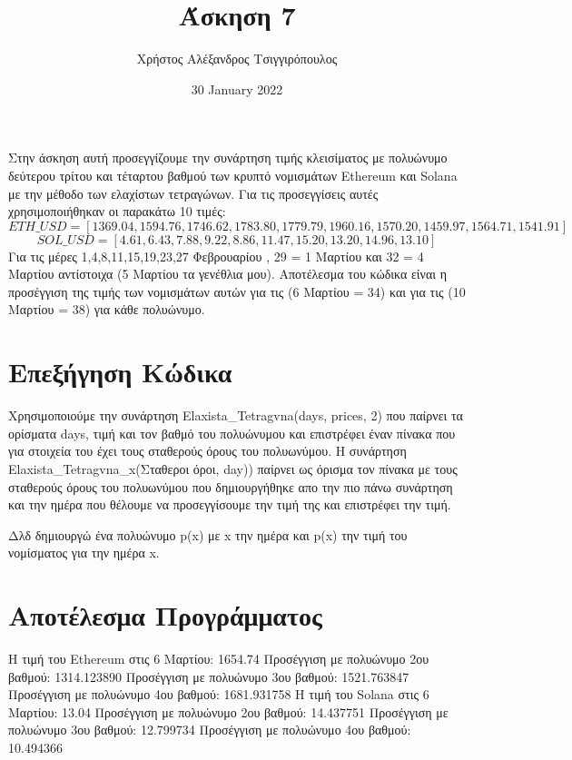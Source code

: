 \documentclass{article}
\title{Άσκηση 7}
\author{Χρήστος Αλέξανδρος Τσιγγιρόπουλος}
\date{30 January 2022}
\begin{document}
    \maketitle
    Στην άσκηση αυτή προσεγγίζουμε την συνάρτηση τιμής κλεισίματος με πολυώνυμο δεύτερου 
    τρίτου και τέταρτου βαθμού των κρυπτό νομισμάτων Ethereum και Solana με την μέθοδο των 
    ελαχίστων τετραγώνων. Για τις προσεγγίσεις αυτές χρησιμοποιήθηκαν οι παρακάτω 10 τιμές:
    \begin{equation*}
        ETH\_USD = [1369.04, 1594.76, 1746.62, 1783.80, 1779.79, 1960.16, 1570.20, 1459.97, 1564.71, 1541.91]
    \end{equation*}
    \begin{equation*}
        SOL\_USD = [4.61, 6.43, 7.88, 9.22, 8.86, 11.47, 15.20, 13.20, 14.96, 13.10]
    \end{equation*}
    Για τις μέρες 1,4,8,11,15,19,23,27 Φεβρουαρίου , 29 = 1 Μαρτίου και 32 = 4 Μαρτίου 
    αντίστοιχα (5 Μαρτίου τα γενέθλια μου).
    Αποτέλεσμα του κώδικα είναι η προσέγγιση της τιμής των νομισμάτων αυτών για τις 
     (6 Μαρτίου = 34) και για τις (10 Μαρτίου = 38) για κάθε πολυώνυμο.

    \section{Επεξήγηση Κώδικα}
    Χρησιμοποιούμε την συνάρτηση Elaxista\_Tetragvna(days, prices, 2) που παίρνει τα ορίσματα days, τιμή και τον βαθμό του πολυώνυμου και επιστρέφει έναν πίνακα που 
    για στοιχεία του έχει τους σταθερούς όρους του πολυωνύμου. Η συνάρτηση Elaxista\_Tetragvna\_x(Σταθεροι όροι, day)) παίρνει ως όρισμα τον πίνακα με τους
    σταθερούς όρους του πολυωνύμου που δημιουργήθηκε απο την πιο πάνω συνάρτηση
    και την ημέρα που θέλουμε να προσεγγίσουμε την τιμή της και επιστρέφει την τιμή.
    
    Δλδ δημιουργώ ένα πολυώνυμο p(x) με x την ημέρα και p(x) την τιμή του νομίσματος για την
    ημέρα x.
    
    \section{Αποτέλεσμα Προγράμματος}
 Η τιμή του Ethereum στις 6 Μαρτίου: 1654.74
     Προσέγγιση με πολυώνυμο 2ου βαθμού: 1314.123890
     Προσέγγιση με πολυώνυμο 3ου βαθμού: 1521.763847
     Προσέγγιση με πολυώνυμο 4ου βαθμού: 1681.931758
 Η τιμή του Solana στις 6 Μαρτίου: 13.04
     Προσέγγιση με πολυώνυμο 2ου βαθμού: 14.437751
     Προσέγγιση με πολυώνυμο 3ου βαθμού: 12.799734
     Προσέγγιση με πολυώνυμο 4ου βαθμού: 10.494366
\end{document}
